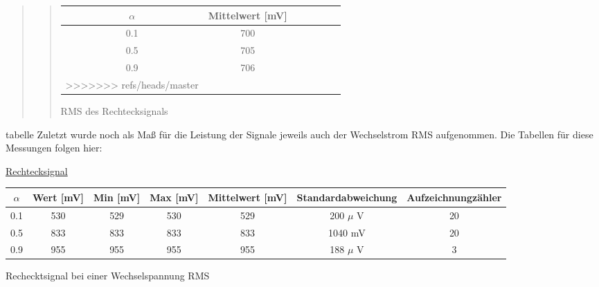 \begin{quote}
\begin{quote}
            \hspace{-4em}
                  \begin{tabular}{|c|c|c|c|c|c|c|}
                  \hline
                   $\alpha $ &  Mittelwert [mV] \\ \hline 
                   0.1 &  700 \\ \hline
                   0.5 &  705 \\ \hline
                   0.9 &  706 \\ \hline           
>>>>>>> refs/heads/master
                 \end{tabular}
                       \caption{RMS des Rechtecksignals}
                        \label{tablelabel1}
        
    \end{quote}


    
    


    
        
\end{quote}





tabelle
    Zuletzt wurde noch als Maß für die Leistung der Signale jeweils auch der
    Wechselstrom RMS aufgenommen. Die Tabellen für diese Messungen folgen hier:
    
    \underline{Rechtecksignal}
        
            \hspace{-4em}
                  \begin{tabular}{|c|c|c|c|c|c|c|}
                  \hline
                   $\alpha $ & Wert [mV] & Min [mV] & Max [mV] & Mittelwert
                   [mV] & Standardabweichung & Aufzeichnungzähler\\ \hline 
                   0.1 & 530 & 529 & 530 & 529 & 200 $\mu$ V & 20 \\ \hline
                   0.5 & 833 & 833 & 833 & 833 & 1040 mV & 20 \\ \hline
                   0.9 & 955 & 955 & 955 & 955 & 188 $\mu$ V & 3 \\ \hline           
                 \end{tabular}
                       \caption{Rechecktsignal bei einer Wechselspannung RMS}
                        \label{tablelabel1}
        
